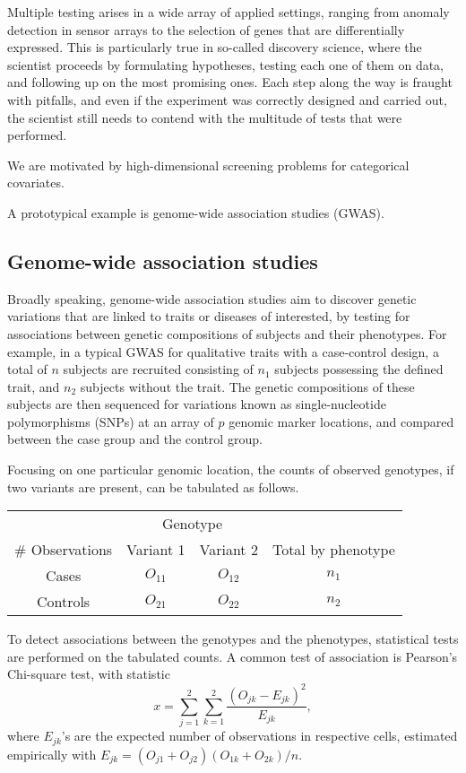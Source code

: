 
Multiple testing arises in a wide array of applied settings, ranging from anomaly
detection in sensor arrays to the selection of genes that are differentially expressed. 
This is particularly true in so-called discovery science, where the scientist proceeds by formulating hypotheses, testing each one of them on data, and following up on the most promising ones. 
Each step along the way is fraught with pitfalls, and even if the experiment was correctly designed and carried out, the scientist still needs to contend with the multitude of tests that were performed.

We are motivated by high-dimensional screening problems for categorical covariates.

A prototypical example is genome-wide association studies (GWAS).

\subsection{Genome-wide association studies}
\label{subsec:motivation-chisq}

Broadly speaking, genome-wide association studies aim to discover genetic variations that are linked to traits or diseases of interested, by testing for associations between genetic compositions of subjects and their phenotypes.
For example, in a typical GWAS for qualitative traits with a case-control design, a total of $n$ subjects are recruited consisting of $n_1$ subjects possessing the defined trait, and $n_2$ subjects without the trait.
The genetic compositions of these subjects are then sequenced for variations known as single-nucleotide polymorphisms (SNPs) at an array of $p$ genomic marker locations, and compared between the case group and the control group.

Focusing on one particular genomic location, the counts of observed genotypes, if two variants are present, can be tabulated as follows.
\begin{center}
    \begin{tabular}{cccc}
    \hline
    & \multicolumn{2}{c}{Genotype} & \\
    \cline{2-3}
    \# Observations & Variant 1 & Variant 2 & Total by phenotype \\
    \hline
    Cases & $O_{11}$ & $O_{12}$ & $n_1$ \\
    Controls & $O_{21}$ & $O_{22}$ & $n_2$ \\
    \hline
    \end{tabular}
\end{center}
To detect associations between the genotypes and the phenotypes, statistical tests are performed on the tabulated counts.
A common test of association is Pearson's Chi-square test, with statistic
\begin{equation} \label{eq:chisq-statistic}
    x = \sum_{j=1}^2 \sum_{k=1}^2 \frac{(O_{jk} - E_{jk})^2}{E_{jk}},
\end{equation}
where $E_{jk}$'s are the expected number of observations in respective cells, estimated empirically with $E_{jk} = (O_{j1}+O_{j2})(O_{1k}+O_{2k})/n$.

